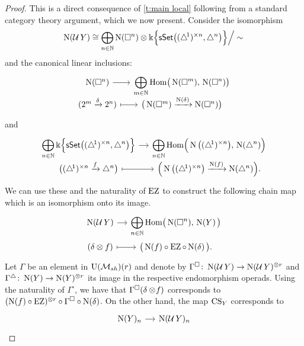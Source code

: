 \begin{proof}
	This is a direct consequence of \cref{t:main local} following from a standard category theory argument, which we now present.
	Consider the isomorphism
	\[
	\chains(\cubify Y) \cong \displaystyle\bigoplus_{n\in\N} \chains(\cube^n) \ot \k\set[\Big]{\sSet \big( \scube{n}, \simplex^n \big)} \Big/ \sim \,
	\]
	and the canonical linear inclusions:
	\[
	\begin{tikzcd} [row sep=-7pt, column sep=small]
		\chains(\cube^n) \arrow[r] &
		\displaystyle\bigoplus_{m \in \N} \Hom \big( \chains(\cube^m),\, \chains(\cube^n) \big) \\
		(2^m \xra{\delta} 2^n) \arrow[r, mapsto] &
		\big(\chains(\cube^m) \xra{\chains(\delta)} \chains(\cube^n)\big)
	\end{tikzcd}
	\vspace*{-7pt}
	\]
	and
	\[
	\begin{tikzcd} [row sep=-5pt, column sep=small]
		\displaystyle \bigoplus_{n \in \N}
		\k\set[\Big]{\sSet\big(\scube{n}, \simplex^n\big)} \arrow[r] &
		\displaystyle \bigoplus_{n \in \N}
		\Hom \Big( \chains \big( \scube{n} \big),\, \chains(\simplex^n) \Big) \\
		\big( \scube{n} \xra{f} \simplex^n \big) \arrow[r, mapsto] &
		\Big( \chains \big( \scube{n} \big) \xra{\chains(f)} \chains(\simplex^n) \Big).
	\end{tikzcd}
	\]
	We can use these and the naturality of $\EZ$ to construct the following chain map which is an isomorphism onto its image.
	\[
	\begin{tikzcd}[column sep=small, row sep=0]
		\chains(\cubify Y) \arrow[r] &
		\displaystyle\bigoplus_{n\in\N} \Hom \big( \chains(\cube^n),\, \chains(Y)\, \big) \\
		(\delta \ot f) \arrow[r, mapsto]& \big( \chains(f) \circ \EZ \circ \chains(\delta) \, \big).
	\end{tikzcd}
	\]
	Let $\Gamma$ be an element in $\UMsh(r)$ and denote by $\Gamma^\cube \colon \chains(\cubify Y) \to \chains(\cubify Y)^{\ot r}$ and $\Gamma^\simplex \colon \chains(Y) \to \chains(Y)^{\ot r}$ its image in the respective endomorphism operads.
	Using the naturality of $\Gamma^\square$, we have that
	$\Gamma^\square(\delta \ot \!f)$ corresponds to $(\chains(f) \circ \EZ)^{\ot r} \circ \Gamma^\square \circ \chains(\delta)$.
	On the other hand, the map $\CS_Y$ corresponds to
	\[
	\begin{tikzcd}[column sep=small, row sep=0]
		\chains(Y)_n \arrow[r] & \chains(\cubify Y)_n \\

\end{tikzcd}\]
\end{proof}
